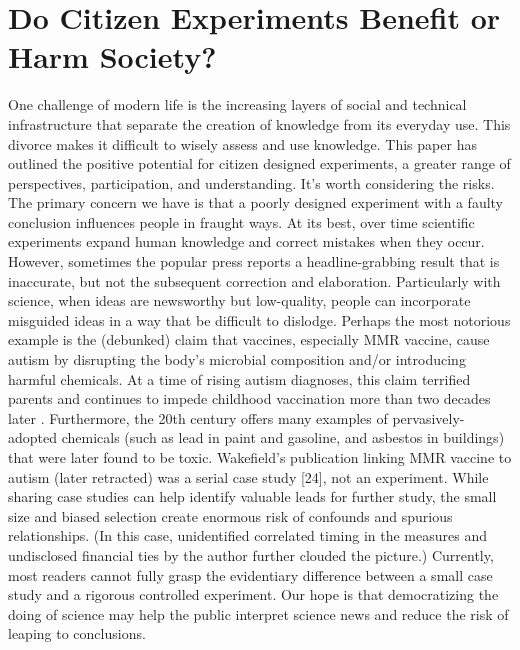\section{Do Citizen  Experiments Benefit or Harm Society?}
One challenge of modern life is the increasing layers of social and technical infrastructure that separate the creation of knowledge from its everyday use. This divorce makes it difficult to wisely assess and use knowledge. This paper has outlined the positive potential for citizen designed experiments, a greater range of perspectives, participation, and understanding. It’s worth considering the risks. The primary concern we have is that a poorly designed experiment with a faulty conclusion influences people in fraught ways. 
At its best, over time scientific experiments expand human knowledge and correct mistakes when they occur. However, sometimes the popular press reports a headline-grabbing result that is inaccurate, but not the subsequent correction and elaboration. Particularly with science, when ideas are newsworthy but low-quality, people can incorporate misguided ideas in a way that be difficult to dislodge. Perhaps the most notorious example is the (debunked) claim that vaccines, especially MMR vaccine, cause autism by disrupting the body’s microbial composition  and/or introducing harmful chemicals. At a time of rising autism diagnoses, this claim terrified parents and continues to impede childhood vaccination more than two decades later . Furthermore, the 20th century offers many examples of pervasively-adopted chemicals (such as lead in paint and gasoline, and asbestos in buildings) that were later found to be toxic. Wakefield’s publication linking MMR vaccine to autism (later retracted) was a serial case study [24], not an experiment. While sharing case studies can help identify valuable leads for further study, the small size and biased selection create enormous risk of confounds and spurious relationships. (In this case, unidentified correlated timing in the measures and undisclosed financial ties by the author further clouded the picture.) Currently, most readers cannot fully grasp the evidentiary difference between a small case study and a rigorous controlled experiment. Our hope is that democratizing the doing of science may help the public interpret science news and reduce the risk of leaping to conclusions.

